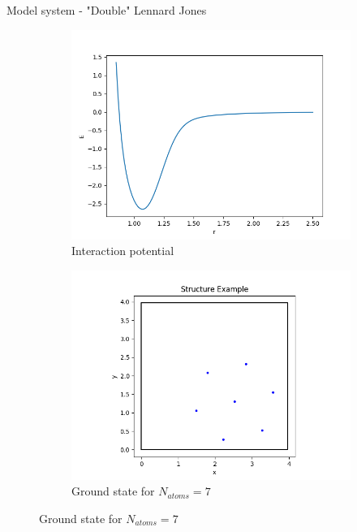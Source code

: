 \documentclass{beamer}
\begin{document}
\begin{frame}{Model system - "Double" Lennard Jones}
	\begin{figure}
		\centering
		\begin{subfigure}{0.5\textwidth}
			\centering
			\includegraphics[width=\linewidth]{doubleLJplot}
			\caption*{Interaction potential}
		\end{subfigure}%
		\begin{subfigure}{0.5\textwidth}
			\centering
			\includegraphics[width=\linewidth]{structureExample}
			\caption*{Ground state for $N_{atoms}=7$}
		\end{subfigure}
	\end{figure}
\end{frame}
\end{document}
